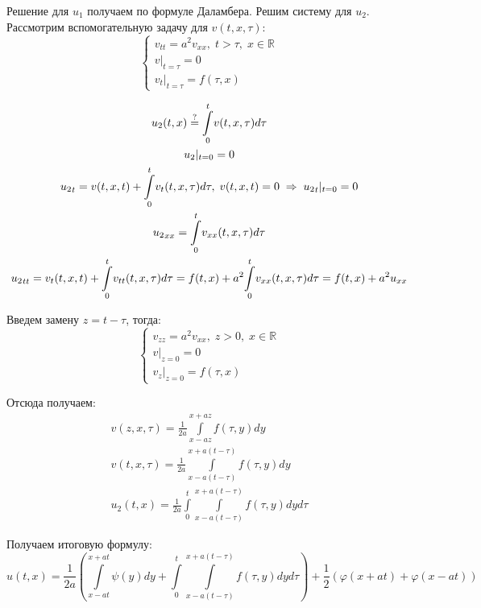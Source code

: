 Решение для $u_1$ получаем по формуле Даламбера. Решим систему для $u_2$. Рассмотрим вспомогательную задачу для $v(t, x, \tau)$:
$$\begin{cases}
	v_{tt} = a^2 v_{xx}, \; t > \tau, \; x \in \mathbb{R} \\
	v|_{t = \tau} = 0 \\
	v_t|_{t = \tau} = f(\tau, x)
\end{cases}$$

$$\begin{gathered}
	u_2 (t,x) \mathrel{\stackrel{\rm ?}=} \underset{0}{\overset{t}{\int}}v(t,x,\tau)d\tau \\
	u_2 |_{t=0} = 0 \\
	{u_2}_t = v(t,x,t) + \underset{0}{\overset{t}{\int}}v_t (t,x,\tau)d\tau, \; v(t,x,t) = 0 \; \Rightarrow \; {u_2}_t |_{t=0} = 0 \\
	{u_2}_{xx} = \underset{0}{\overset{t}{\int}}v_{xx}(t,x,\tau)d\tau \\
	{u_2}_{tt} = v_t (t,x,t) + \underset{0}{\overset{t}{\int}}v_{tt}(t,x,\tau)d\tau = f(t,x) + a^2 \underset{0}{\overset{t}{\int}}v_{xx} (t,x,\tau)d\tau = f(t,x) + a^2 u_{xx}
\end{gathered}$$

Введем замену $z = t - \tau$, тогда:
$$\begin{cases}
	v_{zz} = a^2 v_{xx}, \; z >0, \; x \in \mathbb{R} \\
	v|_{z=0} = 0 \\
	v_z |_{z=0} = f(\tau,x)
\end{cases}$$

Отсюда получаем:
$$\begin{gathered}
	v(z,x,\tau) = \frac{1}{2a} \underset{x - a z}{\overset{x + a z}{\int}}f (\tau, y) dy \\
	v(t,x,\tau) = \frac{1}{2a}\underset{x-a(t-\tau)}{\overset{x+a(t-\tau)}{\int}}f(\tau,y)dy \\
	u_2 (t,x) = \frac{1}{2a}\underset{0}{\overset{t}{\int}}\underset{x-a(t-\tau)}{\overset{x+a(t-\tau)}{\int}}f(\tau,y)dy d\tau
\end{gathered}$$

Получаем итоговую формулу:
$$u(t,x) = \frac{1}{2a} \left( \underset{x-at}{\overset{x+at}{\int}}\psi (y) dy + \underset{0}{\overset{t}{\int}} \underset{x-a(t-\tau)}{\overset{x+a(t-\tau)}{\int}}f(\tau,y)dy d\tau \right) + \frac{1}{2}\left( \varphi(x+at) + \varphi (x-at) \right)$$

